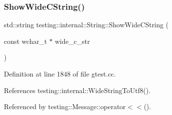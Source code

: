 \subsubsection{\texorpdfstring{Show\+Wide\+C\+String()}{ShowWideCString()}}
{\footnotesize\ttfamily std\+::string testing\+::internal\+::\+String\+::\+Show\+Wide\+C\+String (\begin{DoxyParamCaption}\item[{const wchar\+\_\+t $\ast$}]{wide\+\_\+c\+\_\+str }\end{DoxyParamCaption})\hspace{0.3cm}{\ttfamily [static]}}



Definition at line 1848 of file gtest.\+cc.



References testing\+::internal\+::\+Wide\+String\+To\+Utf8().



Referenced by testing\+::\+Message\+::operator$<$$<$().


